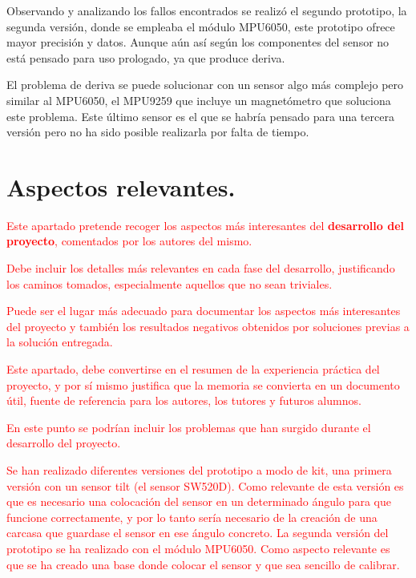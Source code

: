 Observando y analizando los fallos encontrados se realizó el segundo prototipo, la segunda versión, donde se empleaba el módulo MPU6050, este prototipo ofrece mayor precisión y datos. Aunque aún así según los componentes del sensor no está pensado para uso prologado, ya que produce deriva.

El problema de deriva se puede solucionar con un sensor algo más complejo pero similar al MPU6050, el MPU9259 que incluye un magnetómetro que soluciona este problema. Este último sensor es el que se habría pensado para una tercera versión pero no ha sido posible realizarla por falta de tiempo.


\section{Aspectos relevantes.}
\textcolor{red}{
Este apartado pretende recoger los aspectos más interesantes del \textbf{desarrollo del proyecto}, comentados por los autores del mismo.}

\textcolor{red}{Debe incluir los detalles más relevantes en cada fase del desarrollo, justificando los caminos tomados, especialmente aquellos que no sean triviales. }

\textcolor{red}{Puede ser el lugar más adecuado para documentar los aspectos más interesantes del proyecto y también los resultados negativos obtenidos por soluciones previas a la solución entregada.}

\textcolor{red}{Este apartado, debe convertirse en el resumen de la experiencia práctica del proyecto, y por sí mismo justifica que la memoria se convierta en un documento útil, fuente de referencia para los autores, los tutores y futuros alumnos.}

\textcolor{red}{En este punto se podrían incluir los problemas que han surgido durante el desarrollo del proyecto.}

\textcolor{red}{Se han realizado diferentes versiones del prototipo a modo de kit, una primera versión con un sensor tilt (el sensor SW520D). Como relevante de esta versión es que es necesario una colocación del sensor en un determinado ángulo para que funcione correctamente, y por lo tanto sería necesario de la creación de una carcasa que guardase el sensor en ese ángulo concreto. }
\textcolor{red}{La segunda versión del prototipo se ha realizado con el módulo MPU6050. Como aspecto relevante es que se ha creado una base donde colocar el sensor y que sea sencillo de calibrar.}




